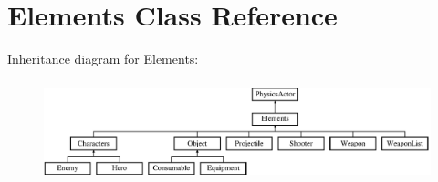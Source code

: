 \hypertarget{class_elements}{\section{Elements Class Reference}
\label{class_elements}
}
Inheritance diagram for Elements\+:\begin{figure}[H]
\begin{center}
\leavevmode
\includegraphics[height=2.947368cm]{class_elements}
\end{center}
\end{figure}
